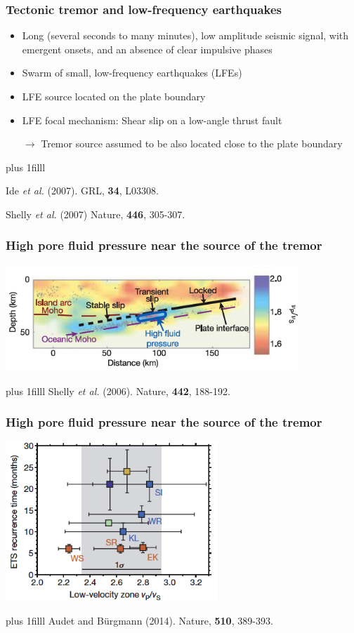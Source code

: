 \documentclass{beamer}
\newcommand{\btVFill}{\vskip0pt plus 1filll}
\begin{document}
	\begin{frame}
		\frametitle{Tectonic tremor and low-frequency earthquakes}
		\vspace{2em}

		\begin{itemize}
			\item Long (several seconds to many minutes), low amplitude seismic signal, with emergent onsets, and an absence of clear impulsive phases
			\item Swarm of small, low-frequency earthquakes (LFEs)
			\item LFE source located on the plate boundary
			\item LFE focal mechanism: Shear slip on a low-angle thrust fault

			\vspace{2em}

			$\rightarrow$ Tremor source assumed to be also located close to the plate boundary
		\end{itemize}
		\btVFill
		\tiny{Ide \textit{et al.} (2007). GRL, \textbf{34}, L03308.

		Shelly \textit{et al.} (2007) Nature, \textbf{446}, 305-307.}
	\end{frame}

	\begin{frame}
		\frametitle{High pore fluid pressure near the source of the tremor}
		\begin{center}
			\includegraphics[trim={0cm 0cm 0cm 0cm}, clip, width=11cm]{articles/shelly_al_2006_4d.png}
		\end{center}
		\btVFill
		\tiny{Shelly \textit{et al.} (2006). Nature, \textbf{442}, 188-192.}
	\end{frame}

	\begin{frame}
		\frametitle{High pore fluid pressure near the source of the tremor}
		\begin{center}
			\includegraphics[trim={0cm 0cm 0cm 0cm}, clip, width=8cm]{articles/audet_burgmann_2014_1b.png}
		\end{center}
		\btVFill
		\tiny{Audet and B\"urgmann (2014). Nature, \textbf{510}, 389-393.}
	\end{frame}
\end{document}
